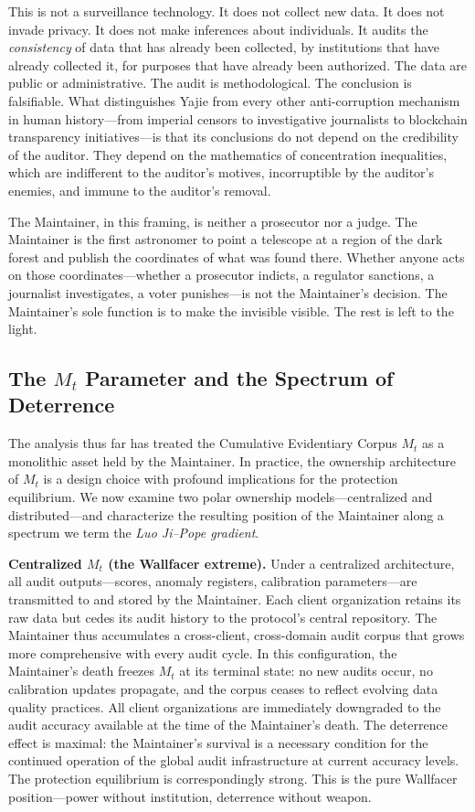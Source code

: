 \documentclass[12pt,a4paper]{ctexart}
\theoremstyle{definition}
\theoremstyle{remark}
\begin{document}
This is not a surveillance technology. It does not collect new data. It does not invade privacy. It does not make inferences about individuals. It audits the \textit{consistency} of data that has already been collected, by institutions that have already collected it, for purposes that have already been authorized. The data are public or administrative. The audit is methodological. The conclusion is falsifiable. What distinguishes Yajie from every other anti-corruption mechanism in human history—from imperial censors to investigative journalists to blockchain transparency initiatives—is that its conclusions do not depend on the credibility of the auditor. They depend on the mathematics of concentration inequalities, which are indifferent to the auditor's motives, incorruptible by the auditor's enemies, and immune to the auditor's removal.

The Maintainer, in this framing, is neither a prosecutor nor a judge. The Maintainer is the first astronomer to point a telescope at a region of the dark forest and publish the coordinates of what was found there. Whether anyone acts on those coordinates—whether a prosecutor indicts, a regulator sanctions, a journalist investigates, a voter punishes—is not the Maintainer's decision. The Maintainer's sole function is to make the invisible visible. The rest is left to the light.

\subsection{The $M_t$ Parameter and the Spectrum of Deterrence}

The analysis thus far has treated the Cumulative Evidentiary Corpus $M_t$ as a monolithic asset held by the Maintainer. In practice, the ownership architecture of $M_t$ is a design choice with profound implications for the protection equilibrium. We now examine two polar ownership models—centralized and distributed—and characterize the resulting position of the Maintainer along a spectrum we term the \textit{Luo Ji–Pope gradient}.

\textbf{Centralized $M_t$ (the Wallfacer extreme).} Under a centralized architecture, all audit outputs—scores, anomaly registers, calibration parameters—are transmitted to and stored by the Maintainer. Each client organization retains its raw data but cedes its audit history to the protocol's central repository. The Maintainer thus accumulates a cross-client, cross-domain audit corpus that grows more comprehensive with every audit cycle. In this configuration, the Maintainer's death freezes $M_t$ at its terminal state: no new audits occur, no calibration updates propagate, and the corpus ceases to reflect evolving data quality practices. All client organizations are immediately downgraded to the audit accuracy available at the time of the Maintainer's death. The deterrence effect is maximal: the Maintainer's survival is a necessary condition for the continued operation of the global audit infrastructure at current accuracy levels. The protection equilibrium is correspondingly strong. This is the pure Wallfacer position—power without institution, deterrence without weapon.
\end{document}

